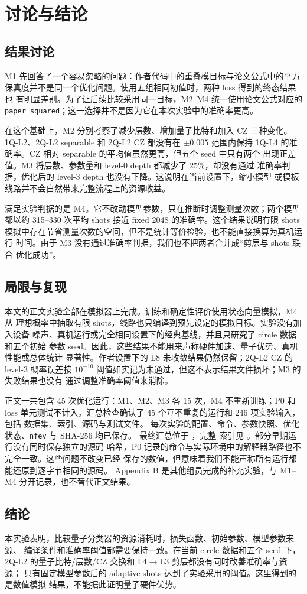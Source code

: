 \section{讨论与结论}
\label{sec:experiments-discussion}

\subsection{结果讨论}

M1 先回答了一个容易忽略的问题：作者代码中的重叠模目标与论文公式中的平方
保真度并不是同一个优化问题。使用五组相同初值时，两种 loss 得到的终态结果也
有明显差别。为了让后续比较采用同一目标，M2--M4 统一使用论文公式对应的
\texttt{paper\_squared}；这一选择并不是因为它在本次实验中的准确率更高。

在这个基础上，M2 分别考察了减少层数、增加量子比特和加入 CZ 三种变化。
1Q-L2、2Q-L2 separable 和 2Q-L2 CZ 都没有在 $\pm0.005$ 范围内保持
1Q-L4 的准确率。CZ 相对 separable 的平均值虽然更高，但五个 seed 中只有两个
出现正差值。M3 将层数、参数量和 level-0 depth 都减少了 $25\%$，却没有通过
准确率判据，优化后的 level-3 depth 也没有下降。这说明在当前设置下，缩小模型
或模板线路并不会自然带来完整流程上的资源收益。

满足实验判据的是 M4。它不改动模型参数，只在推断时调整测量次数；两个模型
都以约 315--330 次平均 shots 接近 fixed 2048 的准确率。这个结果说明有限 shots
模拟中存在节省测量次数的空间，但不是统计等价检验，也不能直接换算为真机运行
时间。由于 M3 没有通过准确率判据，我们也不把两者合并成“剪层与 shots 联合
优化成功”。

\subsection{局限与复现}

本文的正文实验全部在模拟器上完成。训练和确定性评价使用状态向量模拟，M4 从
理想概率中抽取有限 shots，线路也只编译到预先设定的模拟目标。实验没有加入设备
噪声、真机运行或完全相同设置下的经典基线，并且只研究了 circle 数据和五个初始
参数 seed。因此，这些结果不能用来声称硬件加速、量子优势、真机性能或总体统计
显著性。作者设置下的 L8 未收敛结果仍然保留；2Q-L2 CZ 的 level-3 概率误差按
$10^{-10}$ 阈值如实记为未通过，但这不表示结果文件损坏；M3 的失败结果也没有
通过调整准确率阈值来消除。

正文一共包含 45 次优化运行：M1、M2、M3 各 15 次，M4 不重新训练；P0 和 loss
单元测试不计入。汇总检查确认了 45 个互不重复的运行和 246 项实验输入，包括
数据集、索引、源码与测试文件。
每次实验的配置、命令、参数快照、优化状态、\texttt{nfev} 与 SHA-256 均已保存。
最终汇总位于 ，完整
索引见 。部分早期运行没有同时保存独立的源码
哈希，P0 记录的命令与实际环境中的解释器路径也不完全一致。这些问题不改变已经
保存的数值，但意味着我们不能声称所有运行都能还原到逐字节相同的源码。
Appendix B 是其他组员完成的补充实验，与 M1--M4 分开记录，也不替代正文结果。

\subsection{结论}

本实验表明，比较量子分类器的资源消耗时，损失函数、初始参数、模型参数来源、
编译条件和准确率阈值都需要保持一致。在当前 circle 数据和五个 seed 下，
2Q-L2 的量子比特/层数/CZ 交换和 L4$\to$L3 剪层都没有同时改善准确率与资源；
只有固定模型参数后的 adaptive shots 达到了实验采用的阈值。这里得到的是数值模拟
结果，不能据此证明量子硬件优势。
